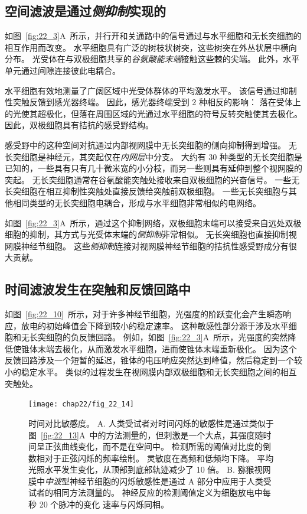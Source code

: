 \subsection{空间滤波是通过\textit{侧抑制}实现的}

如图~\ref{fig:22_3}A~所示，并行开和关通路中的信号通过与水平细胞和无长突细胞的相互作用而改变。
水平细胞具有广泛的树枝状树突，这些树突在外丛状层中横向分布。
光受体在与双极细胞共享的\textit{谷氨酸能末端}接触这些棘的尖端。
此外，水平单元通过间隙连接彼此电耦合。


水平细胞有效地测量了广阔区域中光受体群体的平均激发水平。
该信号通过抑制性突触反馈到感光器终端。
因此，感光器终端受到 2 种相反的影响：
落在受体上的光使其超极化，但落在周围区域的光通过水平细胞的符号反转突触使其去极化。
因此，双极细胞具有拮抗的感受野结构。


感受野中的这种空间对抗通过内部视网膜中无长突细胞的侧向抑制得到增强。
无长突细胞是神经元，其突起仅在\textit{内网层}中分支。
大约有 30 种类型的无长突细胞是已知的，一些具有只有几十微米宽的小分枝，而另一些则具有延伸到整个视网膜的突起。
无长突细胞通常在谷氨酸能突触处接收来自双极细胞的兴奋信号。
一些无长突细胞在相互抑制性突触处直接反馈给突触前双极细胞。
一些无长突细胞与其他相同类型的无长突细胞电耦合，形成与水平细胞非常相似的电网络。


如图~\ref{fig:22_3}A~所示，通过这个抑制网络，双极细胞末端可以接受来自远处双极细胞的抑制，其方式与光受体末端的\textit{侧抑制}非常相似。
无长突细胞也直接抑制视网膜神经节细胞。
这些\textit{侧抑制}连接对视网膜神经节细胞的拮抗性感受野成分有很大贡献。



\subsection{时间滤波发生在突触和反馈回路中}

如图~\ref{fig:22_10}~所示，对于许多神经节细胞，光强度的阶跃变化会产生瞬态响应，放电的初始峰值会下降到较小的稳定速率。
这种敏感性部分源于涉及水平细胞和无长突细胞的负反馈回路。
例如，如图~\ref{fig:22_3}A~所示，光强度的突然降低使锥体末端去极化，从而激发水平细胞，进而使锥体末端重新极化。
因为这个反馈回路涉及一个短暂的延迟，锥体的电压响应突然达到峰值，然后稳定到一个较小的稳定水平。
类似的过程发生在视网膜内部双极细胞和无长突细胞之间的相互突触处。


\begin{figure}[htbp]
	\centering
	\texttt{[image: chap22/fig\_22\_14]}
	\caption{时间对比敏感度。
		A. 人类受试者对时间闪烁的敏感性是通过类似于图~\ref{fig:22_13}A~中的方法测量的，但刺激是一个大点，其强度随时间呈正弦曲线变化，而不是在空间中。 
		检测所需的阈值对比度的倒数相对于正弦闪烁的频率绘制。
		灵敏度在高频和低频均下降。
		平均光照水平发生变化，从顶部到底部轨迹减少了 10 倍。
		B. 猕猴视网膜中\textit{中波}型神经节细胞的闪烁敏感性是通过 A 部分中应用于人类受试者的相同方法测量的。
		神经反应的检测阈值定义为细胞放电中每秒 20 个脉冲的变化 速率与闪烁同相。}
	\label{fig:22_14}
\end{figure}


